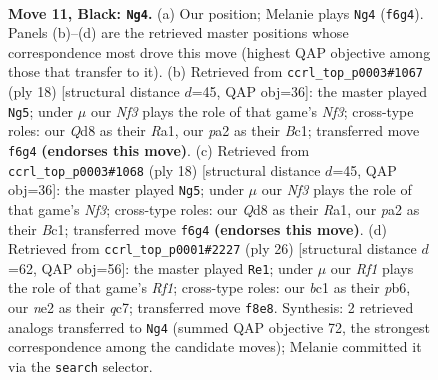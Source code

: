 \documentclass[11pt]{article}
\begin{document}
\clearpage

\begin{figure}[p]\centering
\begin{subfigure}{0.46\textwidth}\centering
\resizebox{\linewidth}{!}{%
\newchessgame
\chessboard[
  setfen={r1bq1rk1/pp3ppp/3b1n2/1B1p4/3p4/3P4/PPP1NPPP/R1BQR1K1 b - - 1 11},
  showmover=false,
  pgfstyle=straightmove, color=movearrow, markmove={f6-g4}
]}
\caption{}
\end{subfigure}\hfill
\begin{subfigure}{0.46\textwidth}\centering
\resizebox{\linewidth}{!}{%
\newchessgame
\chessboard[
  setfen={r1bq1rk1/ppp2ppp/2nb4/3p4/3P4/2PB1N2/P1P2PPP/R1BQ1RK1 w - - 3 10},
  showmover=false,
  pgfstyle=straightmove, color=movearrow, markmove={f3-g5}
]}
\caption{}
\end{subfigure}
\\[4pt]
\begin{subfigure}{0.46\textwidth}\centering
\resizebox{\linewidth}{!}{%
\newchessgame
\chessboard[
  setfen={r1bq1rk1/ppp2ppp/2nb4/3p4/3P4/2PB1N2/P1P2PPP/R1BQ1RK1 w - - 3 10},
  showmover=false,
  pgfstyle=straightmove, color=movearrow, markmove={f3-g5}
]}
\caption{}
\end{subfigure}\hfill
\begin{subfigure}{0.46\textwidth}\centering
\resizebox{\linewidth}{!}{%
\newchessgame
\chessboard[
  setfen={r1b2rk1/p1q1bppp/1pn1p3/4P3/8/2PB1N2/P3QPPP/R1B2RK1 w - - 2 14},
  showmover=false,
  pgfstyle=straightmove, color=movearrow, markmove={f1-e1}
]}
\caption{}
\end{subfigure}
\caption{\textbf{Move 11, Black: \texttt{Ng4}.} (a) Our position; Melanie plays \texttt{Ng4} (\texttt{f6g4}). Panels (b)--(d) are the retrieved master positions whose correspondence most drove this move (highest QAP objective among those that transfer to it). (b) Retrieved from \texttt{ccrl\_top\_p0003\#1067} (ply 18) [structural distance $d$=45, QAP obj=36]: the master played \texttt{Ng5}; under $\mu$ our \emph{Nf3} plays the role of that game's \emph{Nf3}; cross-type roles: our \emph{Q}d8 as their \emph{R}a1, our \emph{p}a2 as their \emph{B}c1; transferred move \texttt{f6g4} \textbf{(endorses this move)}. (c) Retrieved from \texttt{ccrl\_top\_p0003\#1068} (ply 18) [structural distance $d$=45, QAP obj=36]: the master played \texttt{Ng5}; under $\mu$ our \emph{Nf3} plays the role of that game's \emph{Nf3}; cross-type roles: our \emph{Q}d8 as their \emph{R}a1, our \emph{p}a2 as their \emph{B}c1; transferred move \texttt{f6g4} \textbf{(endorses this move)}. (d) Retrieved from \texttt{ccrl\_top\_p0001\#2227} (ply 26) [structural distance $d$=62, QAP obj=56]: the master played \texttt{Re1}; under $\mu$ our \emph{Rf1} plays the role of that game's \emph{Rf1}; cross-type roles: our \emph{b}c1 as their \emph{p}b6, our \emph{n}e2 as their \emph{q}c7; transferred move \texttt{f8e8}. Synthesis: 2 retrieved analogs transferred to \texttt{Ng4} (summed QAP objective 72, the strongest correspondence among the candidate moves); Melanie committed it via the \texttt{search} selector.}
\label{fig:thought-m21}
\end{figure}
\end{document}
